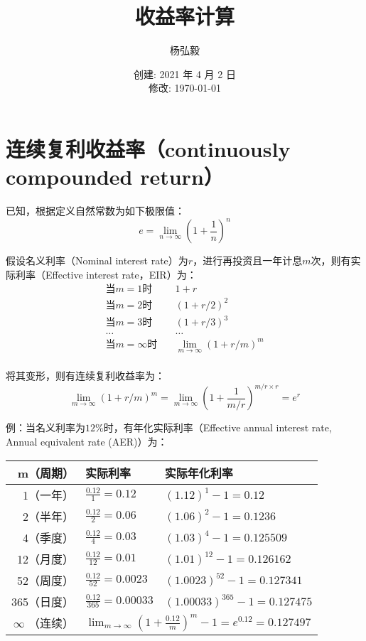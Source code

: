 \documentclass[11pt]{article}
\title{收益率计算}
\author{杨弘毅}
\date{创建: 2021 年 4 月 2 日 \\修改: \today}
\begin{document}
\maketitle

\section{连续复利收益率（continuously compounded return）}

已知，根据定义自然常数为如下极限值：
\begin{equation*}
    e = \lim_{n \rightarrow \infty} \left(1+ \frac{1}{n}\right)^n
\end{equation*}

假设名义利率（Nominal interest rate）为$r$，进行再投资且一年计息$m$次，则有实际利率（Effective interest rate，EIR）为：
\begin{equation*}
    \begin{aligned}
        \text{当$m=1$时} &\quad 1+r \\
        \text{当$m=2$时} &\quad (1+r/2)^2 \\
        \text{当$m=3$时} &\quad (1+r/3)^3 \\
        \dots &\quad \dots \\
        \text{当$m=\infty$时} &\quad \lim_{m \rightarrow \infty} (1+r/m)^m \\
    \end{aligned}
\end{equation*}

将其变形，则有连续复利收益率为：
\begin{equation*}
    \lim_{m \rightarrow \infty} (1+r/m)^m = 
    \lim_{m \rightarrow \infty} (1+\frac{1}{m/r})^{m/r\times r} = e^r
\end{equation*}

例：当名义利率为$12\%$时，有年化实际利率（Effective annual interest rate, Annual equivalent rate (AER)）为：
\begin{table}[H]
\centering
\begin{tabular}{@{}rll@{}}
\toprule
m（周期）  & 实际利率              & 实际年化利率 \\ \midrule
1（一年）   & $\frac{0.12}{1}=0.12$  & $(1.12)^1-1=0.12$ \\
2（半年）   & $\frac{0.12}{2}=0.06$  & $(1.06)^2-1=0.1236$      \\
4（季度）   & $\frac{0.12}{4}=0.03$  & $(1.03)^4-1=0.125509$       \\
12（月度）  & $\frac{0.12}{12}=0.01$ & $(1.01)^{12}-1=0.126162$ \\
52（周度）  & $\frac{0.12}{52}=0.0023$  & $(1.0023)^{52}-1=0.127341$\\
365（日度） & $\frac{0.12}{365}=0.00033$ & $(1.00033)^365-1=0.127475$ \\
$\infty$ （连续）  & \multicolumn{2}{l}{$ \lim_{m \rightarrow \infty} (1+\frac{0.12}{m})^{m} - 1 = e^{0.12} = 0.127497
$}            \\ \bottomrule
\end{tabular}
\end{table}
\end{document}
